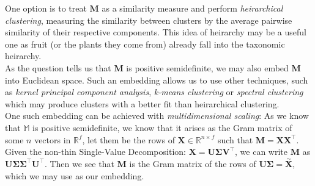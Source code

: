 One option is to treat $\mathbf{M}$ as a similarity measure and perform \textit{heirarchical clustering}, measuring the similarity between clusters by the average pairwise similarity of their respective components. This idea of heirarchy may be a useful one as fruit (or the plants they come from) already fall into the taxonomic heirarchy.\\[1em]

As the question tells us that $\mathbf{M}$ is positive semidefinite, we may also embed $\mathbf{M}$ into Euclidean space. Such an embedding allows us to use other techniques, such as \textit{kernel principal component analysis}, \textit{k-means clustering} or \textit{spectral clustering} which may produce clusters with a better fit than heirarchical clustering.\\[1em]

One such embedding can be achieved with \textit{multidimensional scaling}: As we know that $\mathbb{M}$ is positive semidefinite, we know that it arises as the Gram matrix of some $n$ vectors in $\mathbb{R}^f$, let them be the rows of $\mathbf{X}\in\mathbb{R}^{n\times f}$ such that $\mathbf{M} = \mathbf{X}\mathbf{X}^\intercal$.\\[1em]

Given the non-thin Single-Value Decomposition: $\mathbf{X} = \mathbf{U}\boldsymbol\Sigma\mathbf{V}^\intercal$, we can write $\mathbf{M}$ as $\mathbf{U}\boldsymbol\Sigma\boldsymbol\Sigma^\intercal\mathbf{U}^\intercal$. Then we see that $\mathbf{M}$ is the Gram matrix of the rows of $\mathbf{U}\boldsymbol\Sigma = \overset{\sim}{\mathbf{X}}$, which we may use as our embedding.
